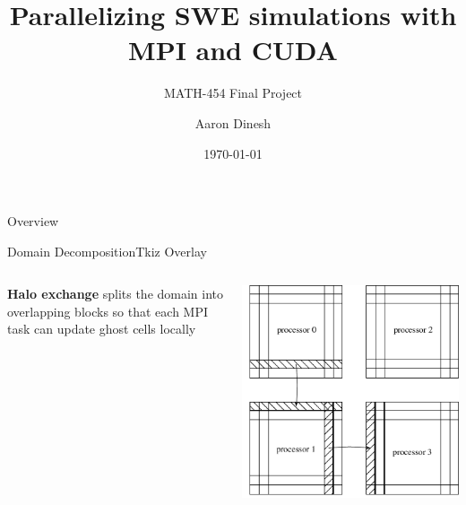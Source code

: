 \documentclass[aspectratio=169,xcolor=dvipsnames,t]{beamer}
\title[MATH-454]{Parallelizing SWE simulations with MPI and CUDA}
\subtitle{MATH-454 Final Project}
\author[Aaron Dinesh]{Aaron Dinesh}
\institute[EPFL]{EPFL}
\date{\today}
\begin{document}
\maketitlepage

\begin{frame}[t]{Overview}
  \tableofcontents[hideallsubsections]
\end{frame}


\begin{frame}{Domain Decomposition}{Tkiz Overlay}
  \begin{columns}[c]            %
    \begin{column}{0.55\linewidth}
      \Large                 %
      \textbf{Halo exchange} splits the domain
      into overlapping blocks so that each MPI
      task can update ghost cells locally
    \end{column}

    \begin{column}{0.45\linewidth}
      \centering
      \includegraphics[width=\linewidth]{figs/HaloExchange.png}
    \end{column}
  \end{columns}
\end{frame}
\end{document}
